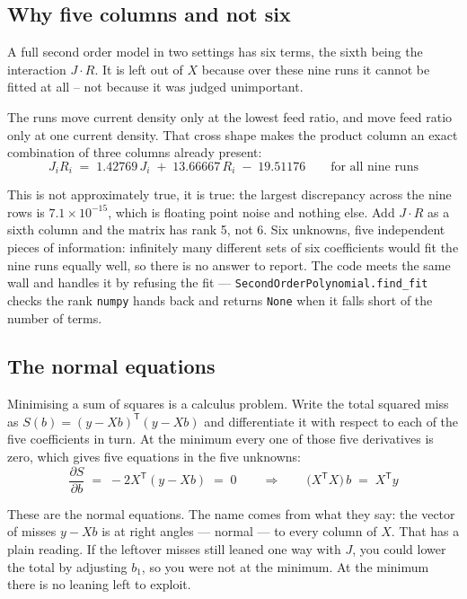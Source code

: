 \subsection{Why five columns and not six}

A full second order model in two settings has six terms, the sixth being the interaction
$J\cdot R$. It is left out of $X$ because over these nine runs it cannot be fitted at all --
not because it was judged unimportant.

The runs move current density only at the lowest feed ratio, and move feed ratio only at one
current density. That cross shape makes the product column an exact combination of three
columns already present:
%
\begin{equation}
  J_i R_i \;=\; 1.42769\,J_i \;+\; 13.66667\,R_i \;-\; 19.51176
  \qquad \text{for all nine runs}
  \label{eq:interaction-identity}
\end{equation}

This is not approximately true, it is true: the largest discrepancy across the nine rows is
$7.1\times10^{-15}$, which is floating point noise and nothing else. Add $J\cdot R$ as a sixth
column and the matrix has rank 5, not 6. Six unknowns, five independent pieces of information:
infinitely many different sets of six coefficients would fit the nine runs equally well, so
there is no answer to report. The code meets the same wall and handles it by refusing the
fit --- \texttt{SecondOrderPolynomial.find\_fit} checks the rank \texttt{numpy} hands back and
returns \texttt{None} when it falls short of the number of terms.

\subsection{The normal equations}

Minimising a sum of squares is a calculus problem. Write the total squared miss as
$S(b) = (y - Xb)^{\mathsf T}(y - Xb)$ and differentiate it with respect to each of the five
coefficients in turn. At the minimum every one of those five derivatives is zero, which gives
five equations in the five unknowns:
%
\begin{equation}
  \frac{\partial S}{\partial b} \;=\; -2X^{\mathsf T}(y - Xb) \;=\; 0
  \qquad\Longrightarrow\qquad
  \bigl(X^{\mathsf T}X\bigr)\,b \;=\; X^{\mathsf T}y
  \label{eq:normal-equations}
\end{equation}

These are the normal equations. The name comes from what they say: the vector of misses
$y - Xb$ is at right angles --- normal --- to every column of $X$. That has a plain reading.
If the leftover misses still leaned one way with $J$, you could lower the total by adjusting
$b_1$, so you were not at the minimum. At the minimum there is no leaning left to exploit.

